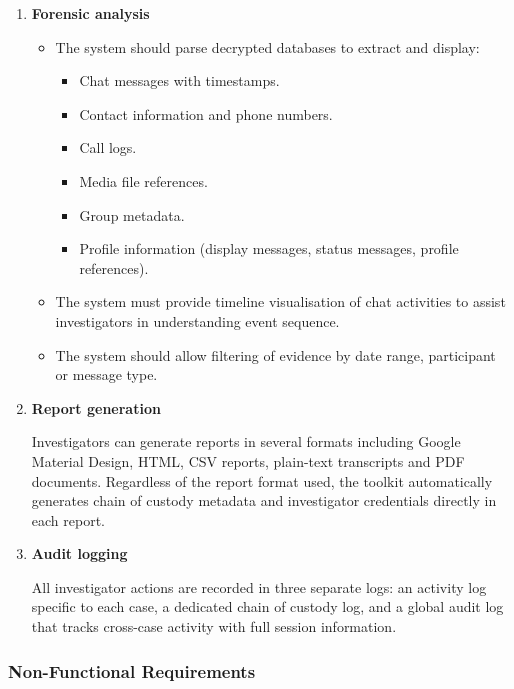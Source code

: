 \documentclass[12pt,a4paper]{report}
\begin{document}
\begin{enumerate}
    \item \textbf{Forensic analysis}
    \begin{itemize}
        \item The system should parse decrypted databases to extract and display:
        \begin{itemize}
            \item Chat messages with timestamps.
            \item Contact information and phone numbers.
            \item Call logs.
            \item Media file references.
            \item Group metadata.
            \item Profile information (display messages, status messages, profile references).
        \end{itemize}
        \item The system must provide timeline visualisation of chat activities to assist investigators in understanding event sequence.
        \item The system should allow filtering of evidence by date range, participant or message type.
    \end{itemize}

    \item \textbf{Report generation}

    Investigators can generate reports in several formats including Google Material Design, HTML, CSV reports, plain-text transcripts and PDF documents. Regardless of the report format used, the toolkit automatically generates chain of custody metadata and investigator credentials directly in each report.

    \item \textbf{Audit logging}

    All investigator actions are recorded in three separate logs: an activity log specific to each case, a dedicated chain of custody log, and a global audit log that tracks cross-case activity with full session information.
\end{enumerate}

\subsubsection{Non-Functional Requirements}
\end{document}
